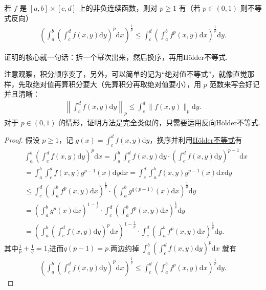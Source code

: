\documentclass[../../main.tex]{subfiles}%
\begin{document}
\begin{theorem}[Minkowski不等式]\label{theorem:Minkowski(闵可夫斯基)不等式}
若 $f$ 是 $[a,b] \times [c,d]$ 上的非负连续函数，则对 $p \geqslant 1$ 有（若 $p \in (0,1)$ 则不等式反向）
\begin{align*}
\left( \int_a^b \left( \int_c^d f(x,y) \mathrm{d}y \right)^p \mathrm{d}x \right)^{\frac{1}{p}} \leqslant \int_c^d \left( \int_a^b f^p(x,y) \mathrm{d}x \right)^{\frac{1}{p}} \mathrm{d}y.
\end{align*}
\end{theorem}
\begin{note}
证明的核心就一句话：拆一个幂次出来，然后换序，再用Hölder不等式.
\end{note}
\begin{remark}
注意观察，积分顺序变了，另外，可以简单的记为“绝对值不等式”，就像直觉那样，先取绝对值再算积分要大（先算积分再取绝对值要小），用 $p$ 范数来写会好记并且清晰：
\begin{align*}
\left\| \int_c^d f(x,y) \mathrm{d}y \right\|_p \leqslant  \int_c^d \|f(x,y)\|_p \mathrm{d}y.
\end{align*}
对于 $p \in (0,1)$ 的情形，证明方法是完全类似的，只需要运用反向Hölder不等式.
\end{remark}
\begin{proof}

假设 $p \geqslant  1$，记 $g(x) = \int_c^d f(x,y) \mathrm{d}y$，换序并利用\hyperref[theorem:Hölder(赫尔德)不等式(积分形式)]{Hölder不等式}有
\begin{align*}
&\int_a^b \left( \int_c^d f(x,y) \mathrm{d}y \right)^p \mathrm{d}x = \int_a^b \int_c^d f(x,y) \mathrm{d}y \cdot \left( \int_c^d f(x,y) \mathrm{d}y \right)^{p-1} \mathrm{d}x
\\
&= \int_a^b \int_c^d f(x,y) g^{p-1}(x) \mathrm{d}y \mathrm{d}x = \int_c^d \int_a^b f(x,y) g^{p-1}(x) \mathrm{d}x \mathrm{d}y
\\
&\leqslant \int_c^d \left( \int_a^b f^p(x,y) \mathrm{d}x \right)^{\frac{1}{p}} \cdot \left( \int_a^b g^{q(p-1)}(x) \mathrm{d}x \right)^{\frac{1}{q}} \mathrm{d}y
\\
&= \left( \int_a^b g^p(x) \mathrm{d}x \right)^{1-\frac{1}{p}} \cdot \int_c^d \left( \int_a^b f^p(x,y) \mathrm{d}x \right)^{\frac{1}{p}} \mathrm{d}y
\\
&= \left( \int_a^b \left( \int_c^d f(x,y) \mathrm{d}y \right)^p \mathrm{d}x \right)^{1-\frac{1}{p}} \cdot \int_c^d \left( \int_a^b f^p(x,y) \mathrm{d}x \right)^{\frac{1}{p}} \mathrm{d}y.
\end{align*}
其中$\frac{1}{p}+\frac{1}{q}=1$,进而$q(p-1)=p$.两边约掉 $\int_a^b \left( \int_c^d f(x,y) \mathrm{d}y \right)^p \mathrm{d}x$ 就有
\begin{align*}
\left( \int_a^b \left( \int_c^d f(x,y) \mathrm{d}y \right)^p \mathrm{d}x \right)^{\frac{1}{p}} \leqslant \int_c^d \left( \int_a^b f^p(x,y) \mathrm{d}x \right)^{\frac{1}{p}} \mathrm{d}y.
\end{align*}

\end{proof}
\end{document}
